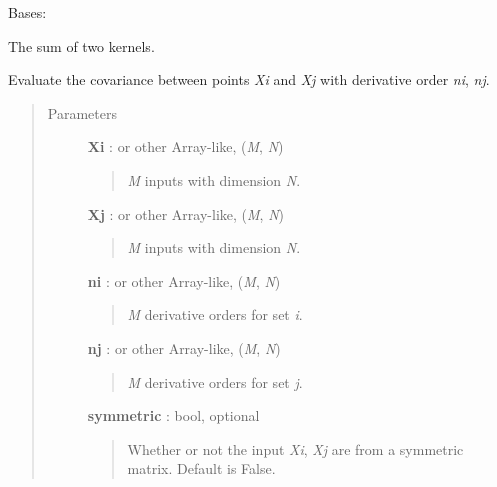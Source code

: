 \documentclass[letterpaper,10pt,english]{sphinxmanual}
\begin{document}

\begin{fulllineitems}
\label{gptools.kernel:gptools.kernel.core.SumKernel}
Bases: {\hyperref[gptools.kernel:gptools.kernel.core.BinaryKernel]{}}

The sum of two kernels.

\begin{fulllineitems}
\label{gptools.kernel:gptools.kernel.core.SumKernel.__call__}
Evaluate the covariance between points \emph{Xi} and \emph{Xj} with derivative order \emph{ni}, \emph{nj}.
\begin{quote}\begin{description}
\item[{Parameters }] \leavevmode
\textbf{Xi} :  or other Array-like, (\emph{M}, \emph{N})
\begin{quote}

\emph{M} inputs with dimension \emph{N}.
\end{quote}

\textbf{Xj} :  or other Array-like, (\emph{M}, \emph{N})
\begin{quote}

\emph{M} inputs with dimension \emph{N}.
\end{quote}

\textbf{ni} :  or other Array-like, (\emph{M}, \emph{N})
\begin{quote}

\emph{M} derivative orders for set \emph{i}.
\end{quote}

\textbf{nj} :  or other Array-like, (\emph{M}, \emph{N})
\begin{quote}

\emph{M} derivative orders for set \emph{j}.
\end{quote}

\textbf{symmetric} : bool, optional
\begin{quote}

Whether or not the input \emph{Xi}, \emph{Xj} are from a symmetric matrix.
Default is False.
\end{quote}


\end{description}
\end{quote}
\end{fulllineitems}
\end{fulllineitems}
\end{document}
